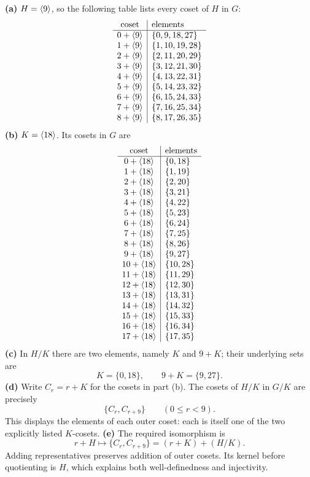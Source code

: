 \textbf{(a)} $H=\langle 9\rangle$, so the following table lists every coset of $H$ in $G$:
\[\begin{array}{c|l}\text{coset}&\text{elements}\\\hline
0+\langle 9\rangle & \{0,9,18,27\} \\
1+\langle 9\rangle & \{1,10,19,28\} \\
2+\langle 9\rangle & \{2,11,20,29\} \\
3+\langle 9\rangle & \{3,12,21,30\} \\
4+\langle 9\rangle & \{4,13,22,31\} \\
5+\langle 9\rangle & \{5,14,23,32\} \\
6+\langle 9\rangle & \{6,15,24,33\} \\
7+\langle 9\rangle & \{7,16,25,34\} \\
8+\langle 9\rangle & \{8,17,26,35\} \\\end{array}\]\textbf{(b)} $K=\langle 18\rangle$. Its cosets in $G$ are
\[\begin{array}{c|l}\text{coset}&\text{elements}\\\hline
0+\langle 18\rangle & \{0,18\} \\
1+\langle 18\rangle & \{1,19\} \\
2+\langle 18\rangle & \{2,20\} \\
3+\langle 18\rangle & \{3,21\} \\
4+\langle 18\rangle & \{4,22\} \\
5+\langle 18\rangle & \{5,23\} \\
6+\langle 18\rangle & \{6,24\} \\
7+\langle 18\rangle & \{7,25\} \\
8+\langle 18\rangle & \{8,26\} \\
9+\langle 18\rangle & \{9,27\} \\
10+\langle 18\rangle & \{10,28\} \\
11+\langle 18\rangle & \{11,29\} \\
12+\langle 18\rangle & \{12,30\} \\
13+\langle 18\rangle & \{13,31\} \\
14+\langle 18\rangle & \{14,32\} \\
15+\langle 18\rangle & \{15,33\} \\
16+\langle 18\rangle & \{16,34\} \\
17+\langle 18\rangle & \{17,35\} \\\end{array}\]\textbf{(c)} In $H/K$ there are two elements, namely $K$ and $9+K$; their underlying sets are
\[
K=\{0,18\},\qquad
9+K=\{9,27\}.
\]
\textbf{(d)} Write $C_r=r+K$ for the cosets in part (b). The cosets of $H/K$ in $G/K$ are precisely
\[
\{C_r,C_{r+9}\}\qquad(0\le r<9).
\]
This displays the elements of each outer coset: each is itself one of the two explicitly listed $K$-cosets.
\textbf{(e)} The required isomorphism is
\[
r+H\longmapsto\{C_r,C_{r+9}\}=(r+K)+(H/K).
\]
Adding representatives preserves addition of outer cosets. Its kernel before quotienting is $H$, which explains both well-definedness and injectivity.

